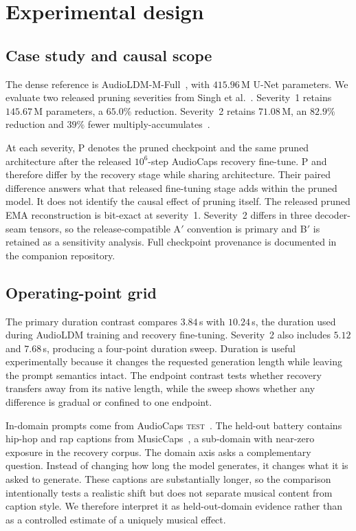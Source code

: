 \section{Experimental design}
\subsection{Case study and causal scope}
The dense reference is AudioLDM-M-Full~\cite{liu2023audioldm}, with $415.96$\,M U-Net parameters. We evaluate two released pruning severities from Singh et al.~\cite{singh2026pruning}. Severity~1 retains $145.67$\,M parameters, a $65.0\%$ reduction. Severity~2 retains $71.08$\,M, an $82.9\%$ reduction and $39\%$ fewer multiply-accumulates~\cite{singh2026pruning}.

At each severity, P denotes the pruned checkpoint and \PFT{} the same pruned architecture after the released $10^{6}$-step AudioCaps recovery fine-tune. P and \PFT{} therefore differ by the recovery stage while sharing architecture. Their paired difference answers what that released fine-tuning stage adds within the pruned model. It does not identify the causal effect of pruning itself. The released pruned EMA reconstruction is bit-exact at severity~1. Severity~2 differs in three decoder-seam tensors, so the release-compatible A$'$ convention is primary and B$'$ is retained as a sensitivity analysis. Full checkpoint provenance is documented in the companion repository.

\subsection{Operating-point grid}
The primary duration contrast compares $3.84$\,s with $10.24$\,s, the duration used during AudioLDM training and recovery fine-tuning. Severity~2 also includes $5.12$ and $7.68$\,s, producing a four-point duration sweep. Duration is useful experimentally because it changes the requested generation length while leaving the prompt semantics intact. The endpoint contrast tests whether recovery transfers away from its native length, while the sweep shows whether any difference is gradual or confined to one endpoint.

In-domain prompts come from AudioCaps \textsc{test}~\cite{kim2019audiocaps}. The held-out battery contains hip-hop and rap captions from MusicCaps~\cite{agostinelli2023musiclm}, a sub-domain with near-zero exposure in the recovery corpus. The domain axis asks a complementary question. Instead of changing how long the model generates, it changes what it is asked to generate. These captions are substantially longer, so the comparison intentionally tests a realistic shift but does not separate musical content from caption style. We therefore interpret it as held-out-domain evidence rather than as a controlled estimate of a uniquely musical effect.


